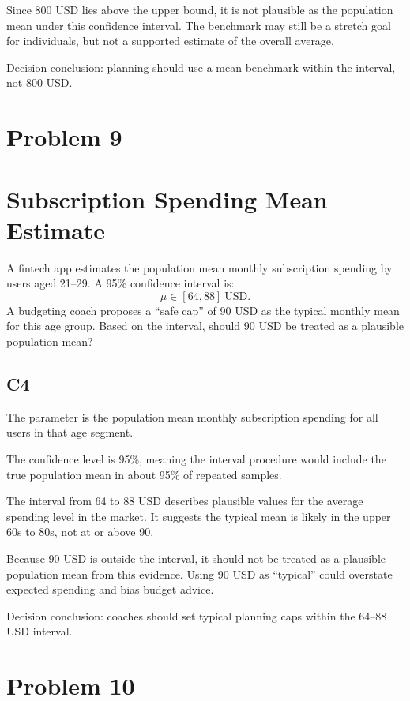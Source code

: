 \begin{ExamProblems}
		Since 800 USD lies above the upper bound, it is not plausible as the population mean under this confidence interval.
		The benchmark may still be a stretch goal for individuals, but not a supported estimate of the overall average.

		Decision conclusion: planning should use a mean benchmark within the interval, not 800 USD.

		\newpage
		\item
		\section{Problem 9}
		\section{Subscription Spending Mean Estimate}
		A fintech app estimates the population mean monthly subscription spending by users aged 21--29.
		A 95\% confidence interval is:
		\[
		\mu \in [64, 88]\ \text{USD}.
		\]
		A budgeting coach proposes a ``safe cap'' of 90 USD as the typical monthly mean for this age group.
		Based on the interval, should 90 USD be treated as a plausible population mean?

		\subsection*{C4}
		The parameter is the population mean monthly subscription spending for all users in that age segment.

		The confidence level is 95\%, meaning the interval procedure would include the true population mean in about 95\% of repeated samples.

		The interval from 64 to 88 USD describes plausible values for the average spending level in the market.
		It suggests the typical mean is likely in the upper 60s to 80s, not at or above 90.

		Because 90 USD is outside the interval, it should not be treated as a plausible population mean from this evidence.
		Using 90 USD as ``typical'' could overstate expected spending and bias budget advice.

		Decision conclusion: coaches should set typical planning caps within the 64--88 USD interval.

		\newpage
		\item
		\section{Problem 10}

\end{ExamProblems}
